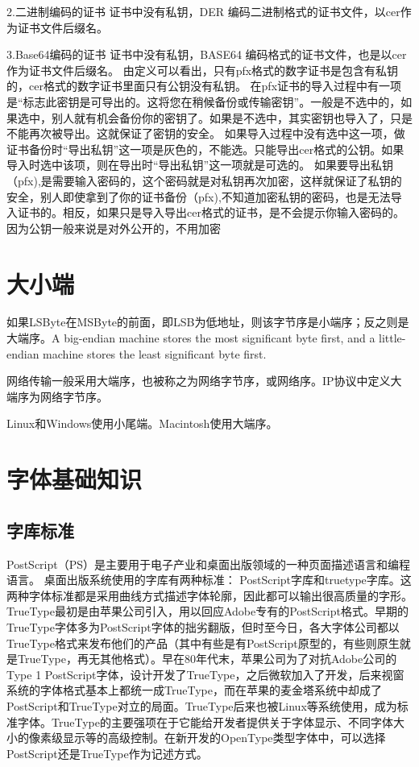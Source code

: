 2.二进制编码的证书
证书中没有私钥，DER 编码二进制格式的证书文件，以cer作为证书文件后缀名。

3.Base64编码的证书
证书中没有私钥，BASE64 编码格式的证书文件，也是以cer作为证书文件后缀名。
由定义可以看出，只有pfx格式的数字证书是包含有私钥的，cer格式的数字证书里面只有公钥没有私钥。
在pfx证书的导入过程中有一项是“标志此密钥是可导出的。这将您在稍候备份或传输密钥”。一般是不选中的，如果选中，别人就有机会备份你的密钥了。如果是不选中，其实密钥也导入了，只是不能再次被导出。这就保证了密钥的安全。
如果导入过程中没有选中这一项，做证书备份时“导出私钥”这一项是灰色的，不能选。只能导出cer格式的公钥。如果导入时选中该项，则在导出时“导出私钥”这一项就是可选的。
如果要导出私钥（pfx),是需要输入密码的，这个密码就是对私钥再次加密，这样就保证了私钥的安全，别人即使拿到了你的证书备份（pfx),不知道加密私钥的密码，也是无法导入证书的。相反，如果只是导入导出cer格式的证书，是不会提示你输入密码的。因为公钥一般来说是对外公开的，不用加密
\section{大小端}

如果LSByte在MSByte的前面，即LSB为低地址，则该字节序是小端序；反之则是大端序。A big-endian machine stores the most significant byte first, and a little-endian machine stores the least significant byte first. 

网络传输一般采用大端序，也被称之为网络字节序，或网络序。IP协议中定义大端序为网络字节序。

Linux和Windows使用小尾端。Macintosh使用大端序。

\section{字体基础知识}

\subsection{字库标准}
PostScript（PS）是主要用于电子产业和桌面出版领域的一种页面描述语言和编程语言。
桌面出版系统使用的字库有两种标准： PostScript字库和truetype字库。这两种字体标准都是采用曲线方式描述字体轮廓，因此都可以输出很高质量的字形。TrueType最初是由苹果公司引入，用以回应Adobe专有的PostScript格式。早期的TrueType字体多为PostScript字体的拙劣翻版，但时至今日，各大字体公司都以TrueType格式来发布他们的产品（其中有些是有PostScript原型的，有些则原生就是TrueType，再无其他格式）。早在80年代末，苹果公司为了对抗Adobe公司的Type 1 PostScript字体，设计开发了TrueType，之后微软加入了开发，后来视窗系统的字体格式基本上都统一成TrueType，而在苹果的麦金塔系统中却成了PostScript和TrueType对立的局面。TrueType后来也被Linux等系统使用，成为标准字体。TrueType的主要强项在于它能给开发者提供关于字体显示、不同字体大小的像素级显示等的高级控制。在新开发的OpenType类型字体中，可以选择PostScript还是TrueType作为记述方式。

